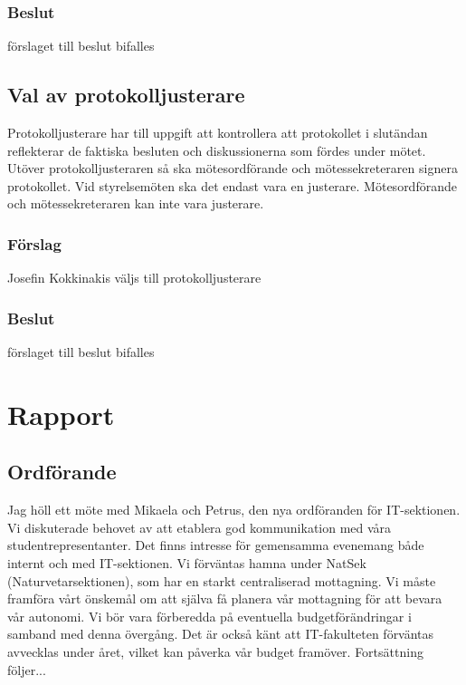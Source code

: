 \documentclass[protokoll]{dvd}
\begin{document}
\subsubsection*{Beslut}
\begin{attsatser}
    \item förslaget till beslut bifalles
\end{attsatser}

\subsection{Val av protokolljusterare}

Protokolljusterare har till uppgift att kontrollera att protokollet i slutändan reflekterar de faktiska besluten och diskussionerna som fördes under mötet.
Utöver protokolljusteraren så ska mötesordförande och mötessekreteraren signera protokollet.
Vid styrelsemöten ska det endast vara en justerare.
Mötesordförande och mötessekreteraren kan inte vara justerare.

\subsubsection*{Förslag}
\begin{attsatser}
    \item Josefin Kokkinakis väljs till protokolljusterare 
\end{attsatser}
\subsubsection*{Beslut}
\begin{attsatser}
    \item förslaget till beslut bifalles
\end{attsatser}

\section{Rapport}
\subsection{Ordförande}
Jag höll ett möte med Mikaela och Petrus, den nya ordföranden för IT-sektionen. 
Vi diskuterade behovet av att etablera god kommunikation med våra studentrepresentanter. 
Det finns intresse för gemensamma evenemang både internt och med IT-sektionen. 
Vi förväntas hamna under NatSek (Naturvetarsektionen), som har en starkt centraliserad mottagning. 
Vi måste framföra vårt önskemål om att själva få planera vår mottagning för att bevara vår autonomi. 
Vi bör vara förberedda på eventuella budgetförändringar i samband med denna övergång. 
Det är också känt att IT-fakulteten förväntas avvecklas under året, vilket kan påverka vår budget framöver. 
Fortsättning följer...
\end{document}
